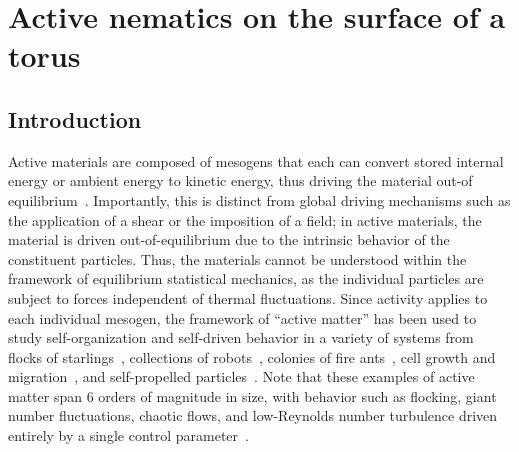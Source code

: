 \chapter{Active nematics on the surface of a torus}\label{c:3}
\section{Introduction}
Active materials are composed of mesogens that each can convert stored internal energy or ambient energy to kinetic energy, thus driving the material out-of equilibrium~\cite{RN237,RN238,RN40}.
Importantly, this is distinct from global driving mechanisms such as the application of a shear or the imposition of a field; in active materials, the material is driven out-of-equilibrium due to the intrinsic behavior of the constituent particles.
Thus, the materials cannot be understood within the framework of equilibrium statistical mechanics, as the individual particles are subject to forces independent of thermal fluctuations.
Since activity applies to each individual mesogen, the framework of ``active matter'' has been used to study self-organization and self-driven behavior in a variety of systems from flocks of starlings~\cite{RN239,RN240}, collections of robots~\cite{RN241}, colonies of fire ants~\cite{RN242}, cell growth and migration~\cite{RN51,RN160}, and self-propelled particles~\cite{RN168,RN38}.
Note that these examples of active matter span 6 orders of magnitude in size, with behavior such as flocking, giant number fluctuations, chaotic flows, and low-Reynolds number turbulence driven entirely by a single control parameter~\cite{RN237,RN238,RN40}. \\

